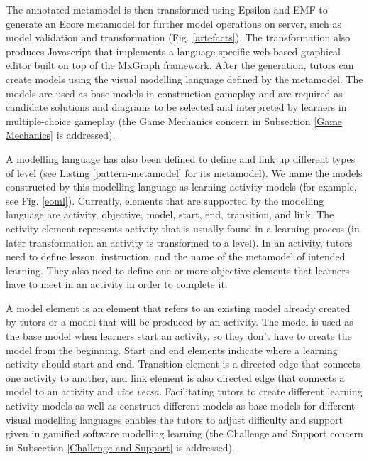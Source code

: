 \documentclass[conference]{IEEEtran}
\begin{document}
The annotated metamodel is then transformed using Epsilon \cite{kolovos2010epsilon} and EMF \cite{steinberg2008emf} to generate an Ecore metamodel for further model operations on server, such as model validation and transformation (Fig. \ref{artefacts}). The transformation also produces Javascript that implements a language-specific web-based graphical editor built on top of the MxGraph framework. After the generation, tutors can create models using the visual modelling language defined by the metamodel. The models are used as base models in construction gameplay and are required as candidate solutions and diagrams to be selected and interpreted by learners in multiple-choice gameplay (the Game Mechanics concern in Subsection \ref{Game Mechanics} is addressed).  

A modelling language has also been defined to define and link up different types of level (see Listing \ref{pattern-metamodel} for its metamodel). We name the models constructed by this modelling language as learning activity models (for example, see Fig. \ref{eoml}). Currently, elements that are supported by the modelling language are activity, objective, model, start, end, transition, and link. The activity element represents activity that is usually found in a learning process (in later transformation an activity is transformed to a level). In an activity, tutors need to define lesson, instruction, and the name of the metamodel of intended learning. They also need to define one or more objective elements that learners have to meet in an activity in order to complete it. 

A model element is an element that refers to an existing model already created by tutors or a model that will be produced by an activity. The model is used as the base model when learners start an activity, so they don't have to create the model from the beginning. Start and end elements indicate where a learning activity should start and end. Transition element is a directed edge that connects one activity to another, and link element is also directed edge that connects a model to an activity and \textit{vice versa}. Facilitating tutors to create different learning activity models as well as construct different models as base models for different visual modelling languages enables the tutors to adjust difficulty and support given in gamified software modelling learning (the Challenge and Support concern in Subsection \ref{Challenge and Support} is addressed). 
\end{document}
